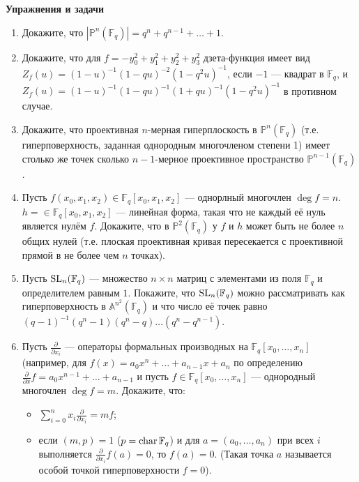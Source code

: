 \noindent\textbf{Упражнения и задачи}

\begin{enumerate}[topsep=0pt]
    \item Докажите, что $|\mathbb{P}^n(\mathbb{F}_q)|=q^n+q^{n-1}+\dots+1$.
    \item Докажите, что для $f=-y_0^2+y_1^2+y_2^2+y_3^2$ дзета-функция имеет вид $Z_f(u) = (1-u)^{-1}(1-qu)^{-2}(1-q^2u)^{-1}$, если $-1$ --- квадрат в $\mathbb{F}_q$, и $Z_f(u) = (1-u)^{-1}(1-qu)^{-1}(1+qu)^{-1}(1-q^2u)^{-1}$ в противном случае. %
    \item Докажите, что проективная $n$-мерная гиперплоскость в $\mathbb{P}^n(\mathbb{F}_q)$ (т.е. гиперповерхность, заданная однородным многочленом степени 1) имеет столько же точек сколько $n-1$-мерное проективное пространство $\mathbb{P}^{n-1}(\mathbb{F}_q)$. %
    \item Пусть $f(x_0,x_1,x_2)\in \mathbb{F}_q[x_0,x_1,x_2]$ --- однорлный многочлен $\deg f = n$. $h = \in \mathbb{F}_q[x_0,x_1,x_2]$ --- линейная форма, такая что не каждый её нуль является нулём $f$. Докажите, что в $\mathbb{P}^2(\mathbb{F}_q)$ у $f$ и $h$ может быть не более $n$ общих нулей (т.е. плоская проективная кривая пересекается с проективной прямой в не более чем $n$ точках). %
    \item Пусть $\operatorname{SL}_n(\mathbb{F}_q)$ --- множество $n\times n$ матриц с элементами из поля $\mathbb{F}_q$ и определителем равным $1$. Покажите, что $\operatorname{SL}_n(\mathbb{F}_q)$ можно рассматривать как гиперповерхность в $\mathbb{A}^{n^2}(\mathbb{F}_q)$ и что число её точек равно $(q-1)^{-1} (q^n-1) (q^n-q) \dots (q^n-q^{n-1})$. %
    \item Пусть $\frac{\partial}{\partial x_i}$ --- операторы формальных производных на $\mathbb{F}_q[x_0,\dots,x_n]$ (например, для $f(x)=a_0 x^n +\dots + a_{n-1}x+a_n$ по определению $\frac{\partial}{\partial x} f=a_0 x^{n-1} +\dots + a_{n-1}$ и пусть $f\in\mathbb{F}_q[x_0,\dots,x_n]$ --- однородный многочлен $\deg f = m$. Докажите, что:
    \begin{itemize}[topsep=0pt]
        \item $\sum_{i=0}^n x_i \frac{\partial}{\partial x_i} = mf$; %
        \item если $(m,p)=1$ ($p=\operatorname{char} \mathbb{F}_q$) и для $a=(a_0,\dots,a_n)$ при всех $i$ выполняется $\frac{\partial}{\partial x_i} f(a)=0$, то $f(a)=0$. (Такая точка $a$ называется особой точкой гиперповерхности $f=0$). %
    \end{itemize}

\end{enumerate}
